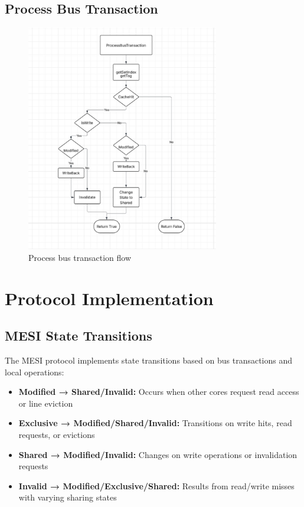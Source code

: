 \documentclass[10pt]{article}
\begin{document}
\subsection{Process Bus Transaction}
\begin{figure}[H]
    \centering
    \includegraphics[width=0.75\textwidth]{./Images/bustransactionflow.jpg}
    \caption{Process bus transaction flow}
\end{figure}

\newpage

\section{Protocol Implementation}
\subsection{MESI State Transitions}
The MESI protocol implements state transitions based on bus transactions and local operations:
\begin{itemize}
    \item \textbf{Modified → Shared/Invalid:} Occurs when other cores request read access or line eviction
    \item \textbf{Exclusive → Modified/Shared/Invalid:} Transitions on write hits, read requests, or evictions
    \item \textbf{Shared → Modified/Invalid:} Changes on write operations or invalidation requests
    \item \textbf{Invalid → Modified/Exclusive/Shared:} Results from read/write misses with varying sharing states
\end{itemize}
\end{document}
